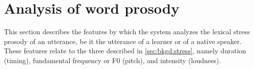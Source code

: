 %	
	
\section{Analysis of word prosody}
\label{sec:diag:prosody}
	

	This section describes the features by which the system analyzes the lexical stress prosody of an utterance, be it the utterance of a learner or of a native speaker. These features relate to the three  described in \cref{sec:bkgd:stress}, namely duration (timing), fundamental frequency or F0 (pitch), and intensity (loudness). 
%
%	

